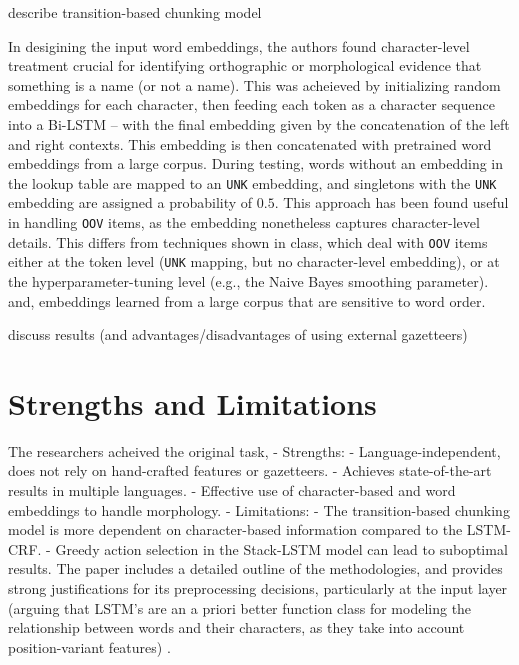 \documentclass[11pt]{article}
\begin{document}

describe transition-based chunking model



In desigining the input word embeddings, 
the authors found character-level 
treatment crucial for identifying 
orthographic or morphological evidence 
that something is a name (or
not a name). This was acheieved by 
initializing random embeddings 
for each character, then feeding
each token as a character sequence into 
a Bi-LSTM – with the final
embedding given by the concatenation 
of the left and right contexts. 
This embedding is then concatenated
with pretrained word embeddings
from a large corpus. During testing, 
words without an embedding in the
lookup table are mapped to an \texttt{UNK} 
embedding, and singletons
with the \texttt{UNK}  embedding are 
assigned a probability of $0.5$.
This approach 
has been found useful in 
handling \texttt{OOV} items, as the embedding
nonetheless captures character-level details.
This differs from techniques shown in class,
which deal with \texttt{OOV} items either
at the token level (\texttt{UNK} mapping, but no character-level embedding),
or at the hyperparameter-tuning level 
(e.g., the Naive Bayes smoothing parameter).
and, embeddings learned from a large corpus 
that are sensitive to word order. 


discuss results (and advantages/disadvantages of using external gazetteers)

\section*{Strengths and Limitations}
The researchers acheived the original task, 
- Strengths:
  - Language-independent, does not rely on hand-crafted features or gazetteers.
  - Achieves state-of-the-art results in multiple languages.
  - Effective use of character-based and word embeddings to handle morphology.
- Limitations:
  - The transition-based chunking model is more dependent on character-based information compared to the LSTM-CRF.
  - Greedy action selection in the Stack-LSTM model can lead to suboptimal results.
  The paper includes a detailed outline
  of the methodologies, and provides strong 
  justifications for its preprocessing decisions, 
  particularly at the input layer (arguing that LSTM's 
  are an a priori better function class for modeling 
  the relationship between words and their characters, 
  as they take into account position-variant features) .
\end{document}
